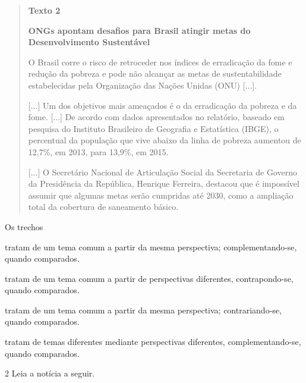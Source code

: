 \begin{quote}
\textbf{Texto 2}

\textbf{ONGs apontam desafios para Brasil atingir metas do
Desenvolvimento Sustentável}

O Brasil corre o risco de retroceder nos índices de erradicação da fome
e redução da pobreza e pode não alcançar as metas de sustentabilidade
estabelecidas pela Organização das Nações Unidas (ONU) {[}...{]}.

{[}...{]} Um dos objetivos mais ameaçados é o da erradicação da pobreza
e da fome. {[}...{]} De acordo com dados apresentados no relatório,
baseado em pesquisa do Instituto Brasileiro de Geografia e Estatística
(IBGE), o percentual da população que vive abaixo da linha de pobreza
aumentou de 12,7\%, em 2013, para 13,9\%, em 2015.

{[}...{]} O Secretário Nacional de Articulação Social da Secretaria de
Governo da Presidência da República, Henrique Ferreira, destacou que é
impossível assumir que algumas metas serão cumpridas até 2030, como a
ampliação total da cobertura de saneamento básico.

\end{quote}

\pagebreak
Os trechos

\begin{escolha}
\item tratam de um tema comum a partir da mesma perspectiva;
complementando-se, quando comparados.

\item tratam de um tema comum a partir de perspectivas diferentes,
contrapondo-se, quando comparados.

\item tratam de um tema comum a partir da mesma perspectiva;
contrariando-se, quando comparados.

\item tratam de temas diferentes mediante perspectivas diferentes,
complementando-se, quando comparados.
\end{escolha}

\num{2} Leia a notícia a seguir.

